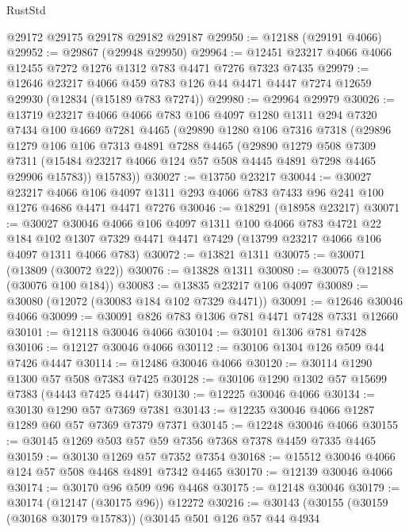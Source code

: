 \begin{lexlean}{RustStd}
\begin{coremodule}
    @29172
    @29175
    @29178
    @29182
    @29187
@29950 := @12188 (@29191 @4066)
@29952 := @29867 (@29948 @29950)
@29964 := @12451 @23217 @4066 @4066 @12455 @7272 @1276 @1312 @783 @4471 @7276 @7323 @7435
@29979 := @12646
    @23217
    @4066
    @459
    @783
    @126
    @44
    @4471
    @4447
    @7274
    @12659
    @29930
    (@12834 (@15189 @783 @7274))
@29980 := @29964 @29979
@30026 := @13719
    @23217
    @4066
    @4066
    @783
    @106
    @4097
    @1280
    @1311
    @294
    @7320
    @7434
    @100
    @4669
    @7281
    @4465
    (@29890
      @1280
      @106
      @7316
      @7318
      (@29896
        @1279
        @106
        @106
        @7313
        @4891
        @7288
        @4465
        (@29890
          @1279
          @508
          @7309
          @7311
          (@15484 @23217 @4066 @124 @57 @508 @4445 @4891 @7298 @4465 @29906 @15783))
        @15783))
@30027 := @13750 @23217
@30044 := @30027
    @23217
    @4066
    @106
    @4097
    @1311
    @293
    @4066
    @783
    @7433
    @96
    @241
    @100
    @1276
    @4686
    @4471
    @4471
    @7276
@30046 := @18291 (@18958 @23217)
@30071 := @30027
    @30046
    @4066
    @106
    @4097
    @1311
    @100
    @4066
    @783
    @4721
    @22
    @184
    @102
    @1307
    @7329
    @4471
    @4471
    @7429
    (@13799 @23217 @4066 @106 @4097 @1311 @4066 @783)
@30072 := @13821 @1311
@30075 := @30071 (@13809 (@30072 @22))
@30076 := @13828 @1311
@30080 := @30075 (@12188 (@30076 @100 @184))
@30083 := @13835 @23217 @106 @4097
@30089 := @30080 (@12072 (@30083 @184 @102 @7329 @4471))
@30091 := @12646 @30046 @4066
@30099 := @30091 @826 @783 @1306 @781 @4471 @7428 @7331 @12660
@30101 := @12118 @30046 @4066
@30104 := @30101 @1306 @781 @7428
@30106 := @12127 @30046 @4066
@30112 := @30106 @1304 @126 @509 @44 @7426 @4447
@30114 := @12486 @30046 @4066
@30120 := @30114 @1290 @1300 @57 @508 @7383 @7425
@30128 := @30106 @1290 @1302 @57 @15699 @7383 (@4443 @7425 @4447)
@30130 := @12225 @30046 @4066
@30134 := @30130 @1290 @57 @7369 @7381
@30143 := @12235 @30046 @4066 @1287 @1289 @60 @57 @7369 @7379 @7371
@30145 := @12248 @30046 @4066
@30155 := @30145 @1269 @503 @57 @59 @7356 @7368 @7378 @4459 @7335 @4465
@30159 := @30130 @1269 @57 @7352 @7354
@30168 := @15512 @30046 @4066 @124 @57 @508 @4468 @4891 @7342 @4465
@30170 := @12139 @30046 @4066
@30174 := @30170 @96 @509 @96 @4468
@30175 := @12148 @30046
@30179 := @30174 (@12147 (@30175 @96)) @12272
@30216 := @30143
    (@30155
      (@30159 (@30168 @30179 @15783))
      (@30145
        @501
        @126
        @57
        @44
        @4934

\end{coremodule}
\end{lexlean}
